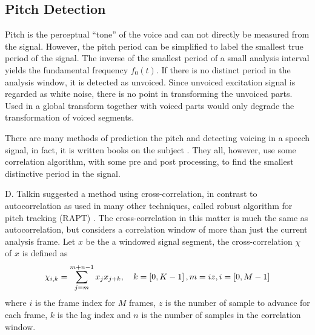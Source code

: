 \subsection{Pitch Detection} %
\label{sub:pitch_detection}
Pitch is the perceptual ``tone'' of the voice and can not directly be measured from the signal. However, the pitch period can be simplified to label the smallest true period of the signal. The inverse of the smallest period of a small analysis interval yields the fundamental frequency $f_0(t)$. If there is no distinct period in the analysis window, it is detected as unvoiced.
Since unvoiced excitation signal is regarded as white noise, there is no point in transforming the unvoiced parts. Used in a global transform together with voiced parts would only degrade the transformation of voiced segments.

There are many methods of prediction the pitch and detecting voicing in a speech signal, in fact, it is written books on the subject \cite{kleijn95}. They all, however, use some correlation algorithm, with some pre and post processing, to find the smallest distinctive period in the signal.

D. Talkin suggested a method using cross-correlation, in contrast to autocorrelation as used in many other techniques, called robust algorithm for pitch tracking (RAPT) \cite{talkin95}. The cross-correlation in this matter is much the same as autocorrelation, but considers a correlation window of more than just the current analysis frame. Let $x$ be the a windowed signal segment, the cross-correlation $\chi$ of $x$ is defined as
\begin{equation}
	\chi_{i,k} = \sum_{j=m}^{m+n-1}x_j x_{j+k}, \quad k=\left[0,K-1\right],m=iz,i=\left[0,M-1\right]
\end{equation}
where $i$ is the frame index for $M$ frames, $z$ is the number of sample to advance for each frame, $k$ is the lag index and $n$ is the number of samples in the correlation window.

